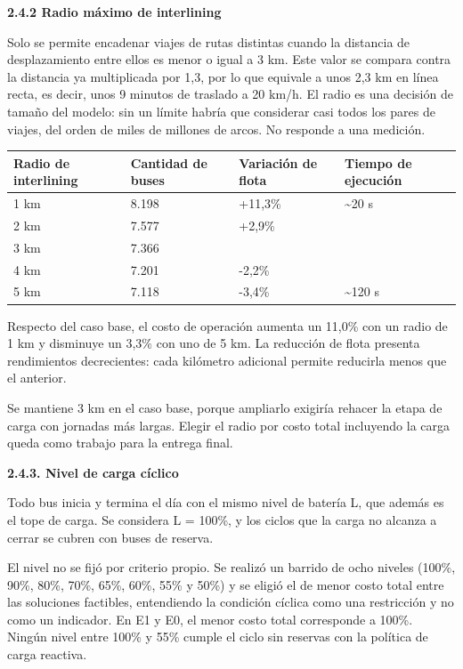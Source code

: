 \textbf{2.4.2 Radio máximo de interlining}

Solo se permite encadenar viajes de rutas distintas cuando la distancia de desplazamiento entre ellos es menor o igual a 3 km. Este valor se compara contra la distancia ya multiplicada por 1,3, por lo que equivale a unos 2,3 km en línea recta, es decir, unos 9 minutos de traslado a 20 km/h. 
El radio es una decisión de tamaño del modelo: sin un límite habría que considerar casi todos los pares de viajes, del orden de miles de millones de arcos. No responde a una medición.

\begin{center}
    \begin{tabular}{|p{3.2cm}|p{3.2cm}|p{3.2cm}|p{3.2cm}|}
    \hline
    Radio de interlining & Cantidad de buses & Variación de flota & Tiempo de ejecución \\
    \hline
    1 km & 8.198 & +11,3\% & \textasciitilde20 s \\
    \hline
    2 km & 7.577 & +2,9\% & \\
    \hline
    3 km & 7.366 & & \\
    \hline
    4 km & 7.201 & -2,2\% & \\
    \hline
    5 km & 7.118 & -3,4\% & \textasciitilde120 s \\
    \hline
    \end{tabular}
    \end{center}

Respecto del caso base, el costo de operación aumenta un 11,0\% con un radio de 1 km y disminuye un 3,3\% con uno de 5 km. La reducción de flota presenta rendimientos decrecientes: cada kilómetro adicional permite reducirla menos que el anterior.

Se mantiene 3 km en el caso base, porque ampliarlo exigiría rehacer la etapa de carga con jornadas más largas. Elegir el radio por costo total incluyendo la carga queda como trabajo para la entrega final. 

\textbf{2.4.3. Nivel de carga cíclico}

Todo bus inicia y termina el día con el mismo nivel de batería L, que además es el tope de carga. Se considera L = 100\%, y los ciclos que la carga no alcanza a cerrar se cubren con buses de reserva.

El nivel no se fijó por criterio propio. Se realizó un barrido de ocho niveles (100\%, 90\%, 80\%, 70\%, 65\%, 60\%, 55\% y 50\%) y se eligió el de menor costo total entre las soluciones factibles, entendiendo la condición cíclica como una restricción y no como un indicador. En E1 y E0, el menor costo total corresponde a 100\%. Ningún nivel entre 100\% y 55\% cumple el ciclo sin reservas con la política de carga reactiva. 


